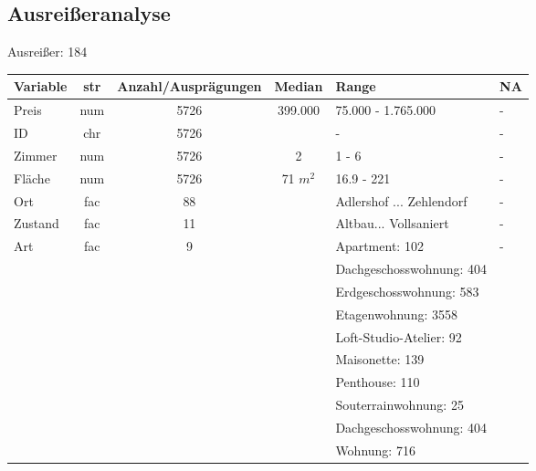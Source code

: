 \subsection{Ausreißeranalyse}\label{sec:Ausreißeranalyse}
\blindtext
Ausreißer: 184
\begin{landscape}
	\begin{tabular}{|l||c|c|c|l|l|} \hline
		Variable         & str  & Anzahl/Ausprägungen & Median	    	& Range                          & NA \\ \hline \hline
		Preis       	 & num  & 5726                & 399.000      	& 75.000 - 1.765.000             & -\\  \hline
		ID               & chr  & 5726                &			    	& -                              & -\\ \hline
		Zimmer           & num  & 5726                & 2    	    	& 1 - 6                          & -\\ \hline
		Fläche           & num  & 5726                &	71 $m^2$	   	& 16.9 - 221                     & -\\ \hline
		Ort      		 & fac	& 88                  &				    & Adlershof ... Zehlendorf       & -  \\ \hline
		Zustand    		 & fac	& 11                  &				    & Altbau... Vollsaniert          & -  \\ \hline
		Art              & fac  & 9                   &    				& Apartment: 102                 & - \\ 
						&      &                     &	    			& Dachgeschosswohnung: 404       & \\
						&      &                     &    				& Erdgeschosswohnung: 583        & \\
						&      &                     &    				& Etagenwohnung: 3558            & \\
						&      &                     &	    			& Loft-Studio-Atelier: 92        & \\
						&      &                     &	    			& Maisonette: 139                & \\
						&      &                     &	    			& Penthouse: 110                 & \\
						&      &                     &	    			& Souterrainwohnung: 25          & \\
						&      &                     &	    			& Dachgeschosswohnung: 404       & \\
						&      &                     &	    			& Wohnung: 716                   & \\ \hline

\end{tabular}
\end{landscape}
